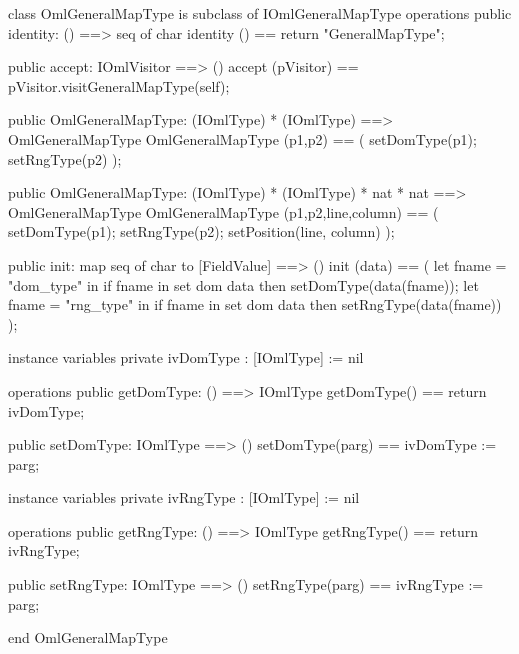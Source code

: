 \begin{vdm_al}
class OmlGeneralMapType is subclass of IOmlGeneralMapType
operations
  public identity: () ==> seq of char
  identity () == return "GeneralMapType";

  public accept: IOmlVisitor ==> ()
  accept (pVisitor) == pVisitor.visitGeneralMapType(self);

  public OmlGeneralMapType:
    (IOmlType) *
    (IOmlType) ==> OmlGeneralMapType
  OmlGeneralMapType (p1,p2) == 
    ( setDomType(p1);
      setRngType(p2) );

  public OmlGeneralMapType:
    (IOmlType) *
    (IOmlType) *
    nat *
    nat ==> OmlGeneralMapType
  OmlGeneralMapType (p1,p2,line,column) == 
    ( setDomType(p1);
      setRngType(p2);
      setPosition(line, column) );

  public init: map seq of char to [FieldValue] ==> ()
  init (data) ==
    ( let fname = "dom_type" in
        if fname in set dom data
        then setDomType(data(fname));
      let fname = "rng_type" in
        if fname in set dom data
        then setRngType(data(fname)) );

instance variables
  private ivDomType : [IOmlType] := nil

operations
  public getDomType: () ==> IOmlType
  getDomType() == return ivDomType;

  public setDomType: IOmlType ==> ()
  setDomType(parg) == ivDomType := parg;

instance variables
  private ivRngType : [IOmlType] := nil

operations
  public getRngType: () ==> IOmlType
  getRngType() == return ivRngType;

  public setRngType: IOmlType ==> ()
  setRngType(parg) == ivRngType := parg;

end OmlGeneralMapType
\end{vdm_al}

